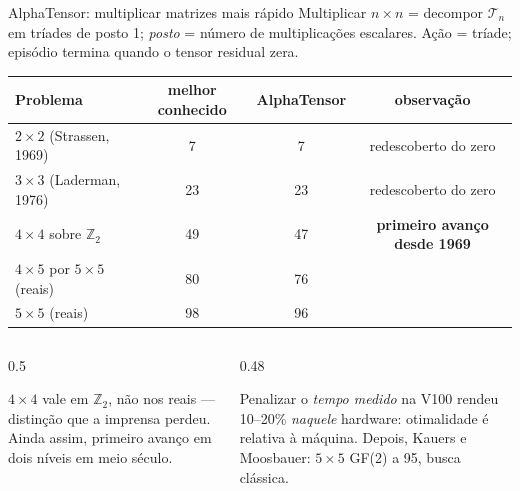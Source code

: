 \documentclass[aspectratio=169, 10pt]{beamer}
\begin{document}
\begin{frame}{AlphaTensor: multiplicar matrizes mais rápido}
  \footnotesize
  Multiplicar $n \times n$ = decompor $\mathcal{T}_n$ em tríades de posto 1; \emph{posto} = número de multiplicações escalares. Ação = tríade; episódio termina quando o tensor residual zera.

  \medskip
  \centering
  \begin{tabular}{lccc}
    \toprule
    Problema & melhor conhecido & AlphaTensor & observação \\
    \midrule
    $2\times2$ (Strassen, 1969)      & 7  & 7  & redescoberto do zero \\
    $3\times3$ (Laderman, 1976)      & 23 & 23 & redescoberto do zero \\
    $4\times4$ sobre $\mathbb{Z}_2$  & 49 & \alert{47} & \textbf{primeiro avanço desde 1969} \\
    $4\times5$ por $5\times5$ (reais)& 80 & 76 & \\
    $5\times5$ (reais)               & 98 & 96 & \\
    \bottomrule
  \end{tabular}

  \medskip
  \begin{columns}[T]
    \begin{column}{0.5\textwidth}
      \begin{ideiabox}
        $4\times4$ vale em $\mathbb{Z}_2$, não nos reais — distinção que a imprensa perdeu. Ainda assim, primeiro avanço em dois níveis em meio século.
      \end{ideiabox}
    \end{column}
    \begin{column}{0.48\textwidth}
      \begin{alertabox}
        Penalizar o \emph{tempo medido} na V100 rendeu 10--20\% \emph{naquele} hardware: otimalidade é relativa à máquina. Depois, Kauers e Moosbauer: $5\times5$ GF(2) a 95, busca clássica.
      \end{alertabox}
    \end{column}
  \end{columns}
\end{frame}
\end{document}
